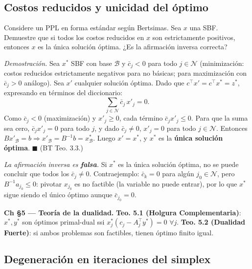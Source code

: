 \documentclass[12pt]{article}
\theoremstyle{plain}
\begin{document}
\subsection{Costos reducidos y unicidad del óptimo}

Considere un PPL en forma estándar según Bertsimas. Sea $x$ una SBF. Demuestre que si
todos los costos reducidos en $x$ son estrictamente positivos, entonces $x$ es la única
solución óptima. ¿Es la afirmación inversa correcta?

\begin{solucion}

\noindent\textit{Demostración.} Sea $x^*$ SBF con base $\mathcal{B}$ y $\bar{c}_j < 0$ para todo $j \in \mathcal{N}$ (minimización: costos reducidos estrictamente negativos para no básicas; para maximización con $\bar{c}_j > 0$ análogo). Sea $x'$ cualquier solución óptima. Dado que $c^\top x' = c^\top x^* = z^*$, expresando en términos del diccionario:
\[
\sum_{j \in \mathcal{N}} \bar{c}_j\, x'_j = 0.
\]
Como $\bar{c}_j < 0$ (maximización) y $x'_j \geq 0$, cada término $\bar{c}_j x'_j \leq 0$. Para que la suma sea cero, $\bar{c}_j x'_j = 0$ para todo $j$, y dado $\bar{c}_j \neq 0$, $x'_j = 0$ para todo $j \in \mathcal{N}$. Entonces $B x'_\mathcal{B} = b \Rightarrow x'_\mathcal{B} = B^{-1}b = x^*_\mathcal{B}$. Luego $x' = x^*$, y $x^*$ es la \textbf{única solución óptima}. $\blacksquare$ (BT Teo. 3.3.)

\noindent\textit{La afirmación inversa es \textbf{falsa}.} Si $x^*$ es la única solución óptima, no se puede concluir que todos los $\bar{c}_j \neq 0$. Contraejemplo: $\bar{c}_k = 0$ para algún $j_0 \in \mathcal{N}$, pero $B^{-1}a_{j_0} \leq 0$: pivotar $x_{j_0}$ es no factible (la variable no puede entrar), por lo que $x^*$ sigue siendo el único óptimo aunque $\bar{c}_{j_0}=0$.

\end{solucion}

\begin{teofund}
\textbf{Ch §5 — Teoría de la dualidad.} \textbf{Teo. 5.1 (Holgura Complementaria)}: $x^*,y^*$ son óptimos primal-dual ssi $x^*_j(c_j-A_j^\top y^*)=0$ $\forall j$. \textbf{Teo. 5.2 (Dualidad Fuerte)}: si ambos problemas son factibles, tienen óptimo finito igual.
\end{teofund}

\bigskip

\subsection{Degeneración en iteraciones del simplex}
\end{document}

